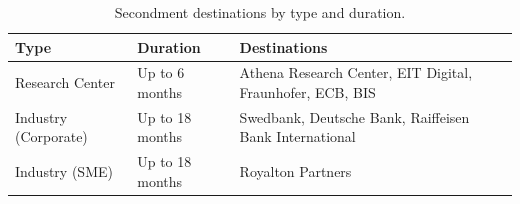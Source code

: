 \begin{table}[h]
\centering
\begin{tabularx}{\textwidth}{@{}l l X@{}}
  \toprule
  \textbf{Type} & \textbf{Duration} & \textbf{Destinations} \\
  \midrule
  Research Center      & Up to 6 months    & Athena Research Center, EIT Digital,
                                             Fraunhofer, ECB, BIS \\
  Industry (Corporate) & Up to 18 months   & Swedbank, Deutsche Bank, Raiffeisen
                                             Bank International \\
  Industry (SME)       & Up to 18 months   & Royalton Partners \\
  \bottomrule
\end{tabularx}
\caption{Secondment destinations by type and duration.}
\label{tab:secondment-destinations}
\end{table}
